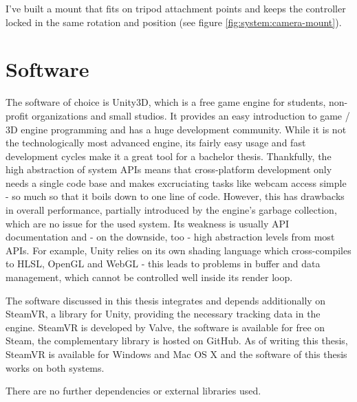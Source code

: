 I've built a mount that fits on tripod attachment points and keeps the 
controller locked in the same rotation and position (see figure 
\ref{fig:system:camera-mount}).



\section{Software}

The software of choice is Unity3D, which is a free game engine for students, 
non-profit organizations and small studios. It provides an easy introduction to 
game / 3D engine programming and has a huge development community. While it is 
not the technologically most advanced engine, its fairly easy usage and fast 
development cycles make it a great tool for a bachelor thesis.
\newline
Thankfully, the high abstraction of system APIs means that cross-platform 
development only needs a single code base and makes excruciating tasks like 
webcam access simple - so much so that it boils down to one line of code. 
However, this has drawbacks in overall performance, partially introduced by the 
engine's garbage collection, which are no issue for the used system.
\newline
Its weakness is usually API documentation and - on the downside, too - high 
abstraction levels from most APIs. For example, Unity relies on its own shading 
language which cross-compiles to HLSL, OpenGL and WebGL - this leads to 
problems in buffer and data management, which cannot be controlled well inside 
its render loop.

The software discussed in this thesis integrates and depends additionally on 
SteamVR, a library for Unity, providing the necessary tracking data in the 
engine. SteamVR is developed by Valve, the software is available for free on 
Steam, the complementary library is hosted on GitHub. As of writing this 
thesis, SteamVR is available for Windows and Mac OS X and the software of this 
thesis works on both systems. 

There are no further dependencies or external libraries used.